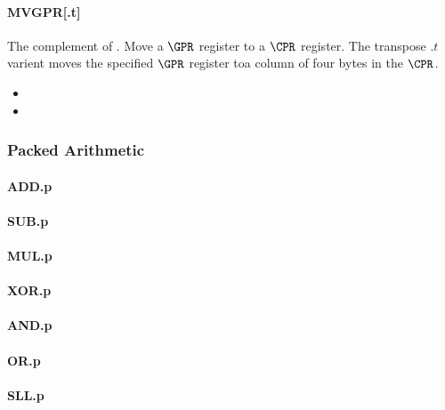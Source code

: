 \paragraph{MVGPR[.t]}

The complement of .
Move a $\GPR$ register to a $\CPR$ register. The transpose $.t$ varient moves
the specified $\GPR$ register toa column of four bytes in the $\CPR$.

\begin{itemize}
\item {}

\item {}
\end{itemize}

\subsubsection{Packed Arithmetic}
\paragraph{ADD.p}
\paragraph{SUB.p}
\paragraph{MUL.p}
\paragraph{XOR.p}
\paragraph{AND.p}
\paragraph{ OR.p}
\paragraph{SLL.p}
